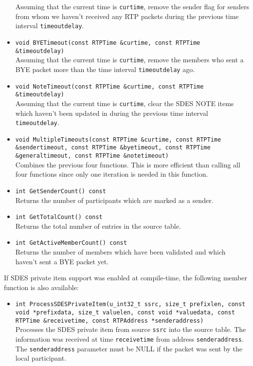 \documentclass[12pt,a4paper]{article}
\begin{document}
\begin{itemize}
						Assuming that the current time is {\tt curtime}, remove the
						sender flag for senders from whom we haven't received any RTP
						packets during the previous time interval {\tt timeoutdelay}.
					\item {\tt void BYETimeout(const RTPTime \&curtime, const RTPTime \&timeoutdelay)}\\
						Assuming that the current time is {\tt curtime}, remove the
						members who sent a BYE packet more than the time interval
						{\tt timeoutdelay} ago.
					\item {\tt void NoteTimeout(const RTPTime \&curtime, const RTPTime \&timeoutdelay)}\\
						Assuming that the current time is {\tt curtime}, clear the SDES 
						NOTE items which haven't been updated in during the previous
						time interval {\tt timeoutdelay}.
					\item {\tt void MultipleTimeouts(const RTPTime \&curtime, const RTPTime \&sendertimeout,
					                                 const RTPTime \&byetimeout, const RTPTime \&generaltimeout,
					                                 const RTPTime \&notetimeout)}\\
						Combines the previous four functions. This is more efficient
						than calling all four functions since only one iteration
						is needed in this function.
					\item {\tt int GetSenderCount() const}\\
						Returns the number of participants which are marked as a
						sender.
					\item {\tt int GetTotalCount() const}\\
						Returns the total number of entries in the source table.
					\item {\tt int GetActiveMemberCount() const}\\
						Returns the number of members which have been validated and
						which haven't sent a BYE packet yet.
				\end{itemize}
				
				If SDES private item support was enabled at compile-time, the following
				member function is also available: 
				\begin{itemize}
					\item {\tt int ProcessSDESPrivateItem(u\_int32\_t ssrc, size\_t prefixlen, const void *prefixdata,
	                                                      size\_t valuelen, const void *valuedata, const RTPTime \&receivetime,
					                                      const RTPAddress *senderaddress)}\\
						Processes the SDES private item from source {\tt ssrc}
						into the source table. The information was received at
						time {\tt receivetime} from address {\tt senderaddress}.
						The {\tt senderaddress} parameter must be NULL if the
						packet was sent by the local participant.
				\end{itemize}
\end{document}
